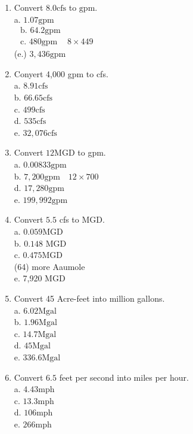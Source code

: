 \begin{enumerate}
\item Convert $8.0 \mathrm{cfs}$ to $\mathrm{gpm}$.\\
a. $1.07 \mathrm{gpm}$\\
$\begin{array}{ll}\text { b. } 64.2 \mathrm{gpm} \\ \text { c. } 480 \mathrm{gpm} & 8 \times 449\end{array}$\\
(e.) $3,436 \mathrm{gpm}$\\

\item Conyert 4,000 gpm to cfs.\\
a.  $8.91 \mathrm{cfs}$\\
b. $66.65 \mathrm{cfs}$\\
c. $499 \mathrm{cfs}$\\
d. $535 \mathrm{cfs}$\\
e. $32,076 \mathrm{cfs}$\\

\item Convert $12 \mathrm{MGD}$ to gpm.\\
a. $0.00833 \mathrm{gpm}$\\
b. $7,200 \mathrm{gpm} \quad 12 \times 700$\\
d. $17,280 \mathrm{gpm}$\\
e. $199,992 \mathrm{gpm}$\\

\item Convert $5.5$ cfs to MGD.\\
a. $0.059 \mathrm{MGD}$\\
b. $0.148$ MGD\\
c. $0.475 \mathrm{MGD}$\\
(64) more Aaumole\\
e. 7,920 MGD\\

\item Convert 45 Acre-feet into million gallons.\\
a. $6.02 \mathrm{Mgal}$\\
b. $1.96 \mathrm{Mgal}$\\
c.  $14.7 \mathrm{Mgal}$\\
d. $45 \mathrm{Mgal}$\\
e. $336.6 \mathrm{Mgal}$\\

\item Convert $6.5$ feet per second into miles per hour.\\
a.  $4.43 \mathrm{mph}$\\
c. $13.3 \mathrm{mph}$\\
d. $106 \mathrm{mph}$\\
e. $266 \mathrm{mph}$\\


\end{enumerate}
